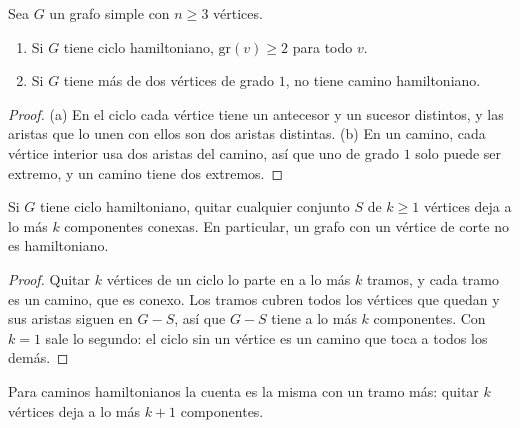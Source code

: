 \documentclass[11pt,letterpaper]{article}
\begin{document}
\begin{teorema}
  \label{teo:hamilton-grado}
  Sea $G$ un grafo simple con $n \ge 3$ vértices.
  \begin{enumerate}[label=(\alph*), itemsep=0pt, parsep=0pt]
    \item Si $G$ tiene ciclo hamiltoniano, $\text{gr}(v) \ge 2$ para
          todo $v$.
    \item Si $G$ tiene más de dos vértices de grado $1$, no tiene
          camino hamiltoniano.
  \end{enumerate}
\end{teorema}

\begin{proof}
  (a) En el ciclo cada vértice tiene un antecesor y un sucesor
  distintos, y las aristas que lo unen con ellos son dos aristas
  distintas. (b) En un camino, cada vértice interior usa dos aristas
  del camino, así que uno de grado $1$ solo puede ser extremo, y un
  camino tiene dos extremos.
\end{proof}

\begin{teorema}
  \label{teo:hamilton-corte}
  Si $G$ tiene ciclo hamiltoniano, quitar cualquier conjunto $S$ de
  $k \ge 1$ vértices deja a lo más $k$ componentes conexas. En
  particular, un grafo con un vértice de corte no es hamiltoniano.
\end{teorema}

\begin{proof}
  Quitar $k$ vértices de un ciclo lo parte en a lo más $k$ tramos, y
  cada tramo es un camino, que es conexo. Los tramos cubren todos los
  vértices que quedan y sus aristas siguen en $G - S$, así que
  $G - S$ tiene a lo más $k$ componentes. Con $k = 1$ sale lo
  segundo: el ciclo sin un vértice es un camino que toca a todos los
  demás.
\end{proof}

Para caminos hamiltonianos la cuenta es la misma con un tramo más:
quitar $k$ vértices deja a lo más $k + 1$ componentes.
\end{document}
